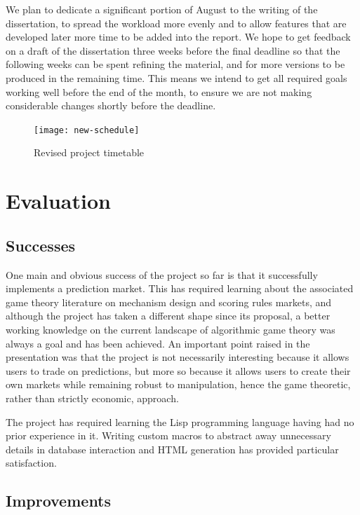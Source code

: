\documentclass[10pt,a4paper]{article}
\theoremstyle{plain}
\theoremstyle{definition}
\begin{document}
We plan to dedicate a significant portion of August to the writing of the
dissertation, to spread the workload more evenly and to allow features that are
developed later more time to be added into the report.  We hope to get feedback
on a draft of the dissertation three weeks before the final deadline so that
the following weeks can be spent refining the material, and for more versions
to be produced in the remaining time. This means we intend to get all required
goals working well before the end of the month, to ensure we are not making
considerable changes shortly before the deadline.

\begin{figure}[h]
	\centering
	\texttt{[image: new-schedule]}
	\caption{Revised project timetable}
	\label{fig:new-schedule}
\end{figure}

\section{Evaluation}

\label{sec:evaluation}

\subsection{Successes}

One main and obvious success of the project so far is that it successfully
implements a prediction market. This has required learning about the associated
game theory literature on mechanism design and scoring rules markets, and
although the project has taken a different shape since its proposal, a better
working knowledge on the current landscape of algorithmic game theory was
always a goal and has been achieved. An important point raised in the
presentation was that the project is not necessarily interesting because it
allows users to trade on predictions, but more so because it allows users to
create their own markets while remaining robust to manipulation, hence the game
theoretic, rather than strictly economic, approach.

The project has required learning the Lisp programming language having had no
prior experience in it. Writing custom macros to abstract away unnecessary
details in database interaction and HTML generation has provided particular
satisfaction.

\subsection{Improvements}
\end{document}
